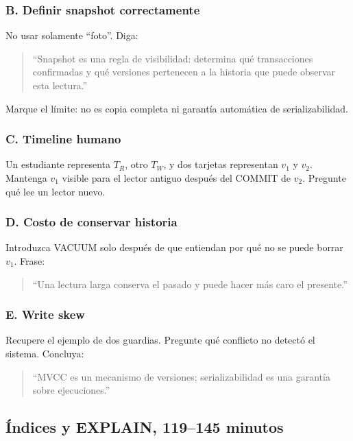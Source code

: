 \documentclass[variant=docente,cover=institutional,mode=screen]{ua-engineering-v6-article}
\begin{document}
\subsubsection*{B. Definir snapshot correctamente}

No usar solamente ``foto''. Diga:

\begin{quote}
``Snapshot es una regla de visibilidad: determina qué transacciones confirmadas y qué versiones pertenecen a la historia que puede observar esta lectura.''
\end{quote}

Marque el límite: no es copia completa ni garantía automática de serializabilidad.

\subsubsection*{C. Timeline humano}

Un estudiante representa $T_R$, otro $T_W$, y dos tarjetas representan $v_1$ y $v_2$. Mantenga $v_1$ visible para el lector antiguo después del COMMIT de $v_2$. Pregunte qué lee un lector nuevo.

\subsubsection*{D. Costo de conservar historia}

Introduzca VACUUM solo después de que entiendan por qué no se puede borrar $v_1$. Frase:

\begin{quote}
``Una lectura larga conserva el pasado y puede hacer más caro el presente.''
\end{quote}

\subsubsection*{E. Write skew}

Recupere el ejemplo de dos guardias. Pregunte qué conflicto no detectó el sistema. Concluya:

\begin{quote}
``MVCC es un mecanismo de versiones; serializabilidad es una garantía sobre ejecuciones.''
\end{quote}

\subsection{Índices y EXPLAIN, 119--145 minutos}
\end{document}

